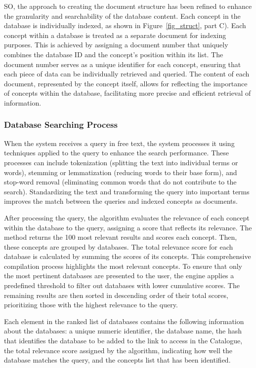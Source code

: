 SO, the approach to creating the document structure has been refined to enhance the granularity and searchability of the database content. Each concept in the database is individually indexed, as shown in Figure~\ref{fig_struct}, part C). Each concept within a database is treated as a separate document for indexing purposes. This is achieved by assigning a document number that uniquely combines the database ID and the concept's position within its list. The document number serves as a unique identifier for each concept, ensuring that each piece of data can be individually retrieved and queried. The content of each document, represented by the concept itself, allows for reflecting the importance of concepts within the database, facilitating more precise and efficient retrieval of information.


\subsubsection{Database Searching Process}
\label{searchprocess}

When the {\ir} system receives a query in free text, the system processes it using {\nlp} techniques applied to the query to enhance the search performance. These processes can include tokenization (splitting the text into individual terms or words), stemming or lemmatization (reducing words to their base form), and stop-word removal (eliminating common words that do not contribute to the search). Standardizing the text and transforming the query into important terms improves the match between the queries and indexed concepts as documents.

After processing the query, the {\bm} algorithm evaluates the relevance of each concept within the database to the query, assigning a score that reflects its relevance. The method returns the 100 most relevant results and scores each concept. Then, these concepts are grouped by databases. The total relevance score for each database is calculated by summing the scores of its concepts. This comprehensive compilation process highlights the most relevant concepts. To ensure that only the most pertinent databases are presented to the user, the engine applies a predefined threshold to filter out databases with lower cumulative scores. The remaining results are then sorted in descending order of their total scores, prioritizing those with the highest relevance to the query.

Each element in the ranked list of databases contains the following information about the databases: a unique numeric identifier, the database name, the hash that identifies the database to be added to the link to access in the {\ehden} Catalogue, the total relevance score assigned by the {\bm} algorithm, indicating how well the database matches the query, and the concepts list that has been identified.


